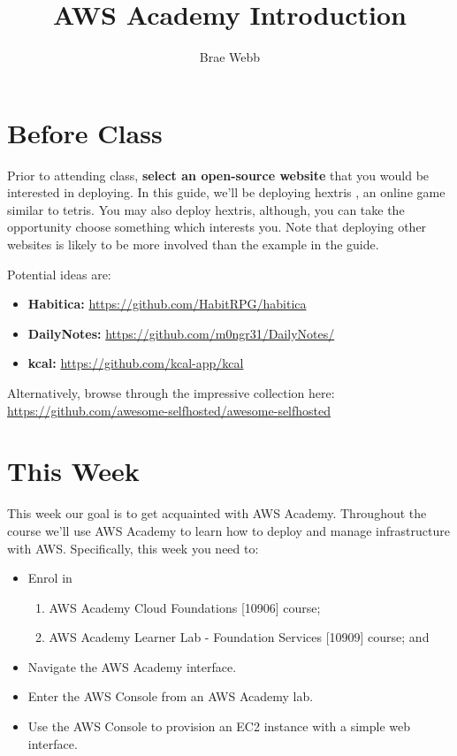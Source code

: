 \documentclass{csse4400}
\title{AWS Academy Introduction}
\author{Brae Webb}
\date{\week{1}}
\begin{document}
\maketitle

\section{Before Class}
Prior to attending class, \textbf{select an open-source website} that you would be interested in deploying.
In this guide, we'll be deploying hextris \cite{hextris}, an online game similar to tetris.
You may also deploy hextris, although,
you can take the opportunity choose something which interests you.
Note that deploying other websites is likely to be more involved than the example in the guide.

Potential ideas are:
\begin{itemize}
    \item \textbf{Habitica:} \url{https://github.com/HabitRPG/habitica}
    \item \textbf{DailyNotes:} \url{https://github.com/m0ngr31/DailyNotes/}
    \item \textbf{kcal:} \url{https://github.com/kcal-app/kcal} 
\end{itemize}

\noindent Alternatively, browse through the impressive collection here:\\ \url{https://github.com/awesome-selfhosted/awesome-selfhosted}

\section{This Week}
This week our goal is to get acquainted with AWS Academy.
Throughout the course we'll use AWS Academy to learn how to deploy and manage infrastructure with AWS.
Specifically, this week you need to:
\begin{itemize}
    \item Enrol in
    \begin{enumerate}
        \item AWS Academy Cloud Foundations [10906] course;
        \item AWS Academy Learner Lab - Foundation Services [10909] course; and
    \end{enumerate}
    \item Navigate the AWS Academy interface.
    \item Enter the AWS Console from an AWS Academy lab.
    \item Use the AWS Console to provision an EC2 instance with a simple web interface.
\end{itemize}
\end{document}
